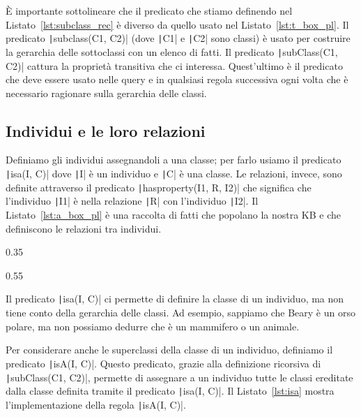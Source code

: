 È importante sottolineare che il predicato che stiamo definendo nel Listato~\ref{lst:subclass_rec} è diverso da quello usato nel Listato~\ref{lst:t_box_pl}. Il predicato \texttt|subclass(C1, C2)| (dove \texttt|C1| e \texttt|C2| sono classi) è usato per costruire la gerarchia delle sottoclassi con un elenco di fatti. Il predicato \texttt|subClass(C1, C2)| cattura la proprietà transitiva che ci interessa. Quest'ultimo è il predicato che deve essere usato nelle query e in qualsiasi regola successiva ogni volta che è necessario ragionare sulla gerarchia delle classi.

\subsection{Individui e le loro relazioni}
Definiamo gli individui assegnandoli a una classe; per farlo usiamo il predicato \texttt|isa(I, C)| dove \texttt|I| è un individuo e \texttt|C| è una classe. Le relazioni, invece, sono definite attraverso il predicato \texttt|hasproperty(I1, R, I2)| che significa che l'individuo \texttt|I1| è nella relazione \texttt|R| con l'individuo \texttt|I2|. Il Listato~\ref{lst:a_box_pl} è una raccolta di fatti che popolano la nostra KB e che definiscono le relazioni tra individui.

\begin{listingenv}[h]
	\centering
	\begin{sublisting}[c]{0.35\linewidth}
		\caption{Definizioni degli individui}
		\label{lst:a_box_pl_ind}
	\end{sublisting}
	\qquad
	\begin{sublisting}[c]{0.55\linewidth}
		\caption{Definizioni delle relazioni}
		\label{lst:a_box_pl_rel}
	\end{sublisting}
	\caption{Definizione della A-Box}
	\label{lst:a_box_pl}
\end{listingenv}



Il predicato \texttt|isa(I, C)| ci permette di definire la classe di un individuo, ma non tiene conto della gerarchia delle classi. Ad esempio, sappiamo che Beary è un orso polare, ma non possiamo dedurre che è un mammifero o un animale.

Per considerare anche le superclassi della classe di un individuo, definiamo il predicato \texttt|isA(I, C)|. Questo predicato, grazie alla definizione ricorsiva di \texttt|subClass(C1, C2)|, permette di assegnare a un individuo tutte le classi ereditate dalla classe definita tramite il predicato \texttt|isa(I, C)|. Il Listato~\ref{lst:isa} mostra l'implementazione della regola \texttt|isA(I, C)|.

